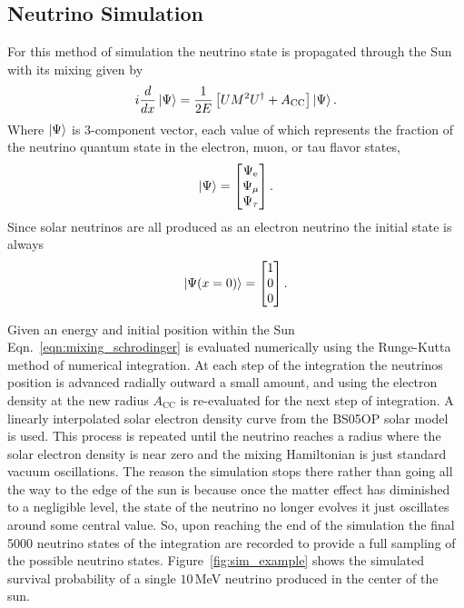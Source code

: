 \subsection{Neutrino Simulation}
For this method of simulation the neutrino state is propagated through the
Sun with its mixing given by
\begin{equation}
    i\frac{d}{dx}\ket{\Psi} =\frac{1}{2E}\left[UM^{2}U^{\dagger} + A_{\mathrm{CC}}\right]\ket{\Psi}\text{.}
    \label{eqn:mixing_schrodinger}
\end{equation}
Where $\ket{\Psi}$ is 3-component vector, each value of which represents
the fraction of the neutrino quantum state in the electron, muon, or tau flavor states,
\begin{equation}
\ket{\Psi} = 
\begin{bmatrix}
    \Psi_{\mathrm{e}}\\
    \Psi_{\mathrm{\mu}}\\
    \Psi_{\mathrm{\tau}}\\
\end{bmatrix}\mathrm{.}
\end{equation}
Since solar neutrinos are all produced as an electron neutrino the
initial state is always
\begin{equation}
\ket{\Psi(x=0)} = 
\begin{bmatrix}
1\\
0\\
0\\
\end{bmatrix}\mathrm{.}
\end{equation}

Given an energy and initial position within the Sun
Eqn.~\eqref{eqn:mixing_schrodinger}
is evaluated numerically using the Runge-Kutta method of numerical integration.
At each step of the integration the neutrinos position is advanced radially
outward a small amount, and using the electron density at the new radius
$A_{\mathrm{CC}}$ is re-evaluated for the next step of integration.
A linearly interpolated solar electron density curve from the BS05OP solar model~\citep{bs_ssm} is used.
This process is repeated until the neutrino reaches a radius where
the solar electron density is near zero and the mixing Hamiltonian is
just standard vacuum oscillations.
The reason the simulation stops there rather than going all the way to the
edge of the sun is because once the matter effect has diminished to a negligible
level, the state of the neutrino no longer evolves it just oscillates around
some central value.
So, upon reaching the end of the simulation the final 5000 neutrino states of the
integration are recorded to provide a full sampling of the possible
neutrino states.
Figure~\ref{fig:sim_example} shows the simulated survival probability of a single
$10$\,MeV neutrino produced in the center of the sun.

